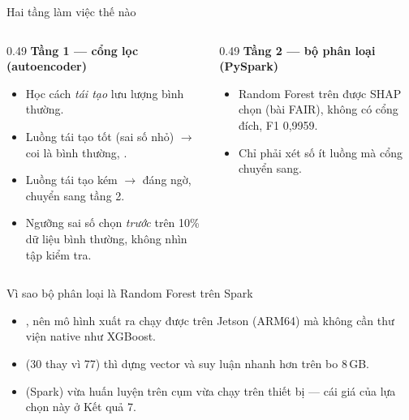 \documentclass[aspectratio=169, 11pt]{beamer}
\begin{document}
\begin{frame}{Hai tầng làm việc thế nào}
  \begin{columns}[T]
    \begin{column}{0.49\textwidth}
      \textbf{Tầng 1 --- cổng lọc (autoencoder)}
      \begin{itemize}\small
        \item Học cách \emph{tái tạo} lưu lượng bình thường.
        \item Luồng tái tạo tốt (sai số nhỏ) $\rightarrow$ coi là bình thường,
              .
        \item Luồng tái tạo kém $\rightarrow$ đáng ngờ, chuyển sang tầng 2.
        \item Ngưỡng sai số chọn \emph{trước} trên 10\% dữ liệu bình thường,
              không nhìn tập kiểm tra.
      \end{itemize}
    \end{column}
    \begin{column}{0.49\textwidth}
      \textbf{Tầng 2 --- bộ phân loại (PySpark)}
      \begin{itemize}\small
        \item Random Forest trên  được SHAP chọn
              (bài FAIR), không có cổng đích, F1 0,9959.
        \item Chỉ phải xét số ít luồng mà cổng chuyển sang.
      \end{itemize}
    \end{column}
  \end{columns}
\end{frame}

\begin{frame}{Vì sao bộ phân loại là Random Forest trên Spark}
  \begin{itemize}
    \setlength{\itemsep}{0.5em}
    \item {}, nên mô hình xuất ra chạy
          được trên Jetson (ARM64) mà không cần thư viện native như XGBoost.
    \item {} (30 thay vì 77) thì dựng vector và suy luận nhanh
          hơn trên bo 8\,GB.
    \item {} (Spark) vừa huấn luyện trên cụm vừa chạy
          trên thiết bị --- cái giá của lựa chọn này ở Kết quả 7.
  \end{itemize}
\end{frame}
\end{document}
